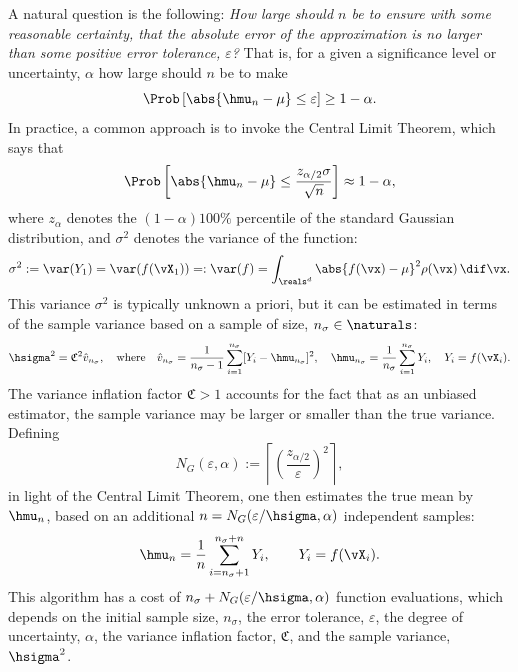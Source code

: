 \documentclass[graybox]{svmult}
\newcommand{\hv}{\hat{v}}
\newcommand{\fudge}{\mathfrak{C}}
\begin{document}
A natural question is the following: \emph{How large should $n$ be to ensure with some reasonable certainty, that the absolute error of the approximation is no larger than some positive error tolerance, $\varepsilon$?}  That is, for a given a significance level or uncertainty, $\alpha$ how large should $n$ be to make 
\begin{equation} \label{abserr}
\Prob\left[\abs{\hmu_n-\mu} \le \varepsilon \right] \geq 1-\alpha.
\end{equation}
In practice, a common approach is to invoke the Central Limit Theorem, which says that
\begin{equation} \label{CLT}
\Prob\left[\abs{\hmu_n-\mu} \le \frac{z_{\alpha/2} \sigma}{\sqrt{n}} \right] \approx 1-\alpha,
\end{equation}
where $z_\alpha$ denotes the $(1-\alpha)100\%$ percentile of the standard Gaussian distribution, and $\sigma^2$ denotes the variance of the function:
\begin{equation} \label{sigmadef}
\sigma^2 := \var(Y_1) = \var(f(\vX_1)) =: \var(f) = \int_{\reals^d} \abs{f(\vx)-\mu}^2 \rho(\vx) \, \dif \vx.
\end{equation}
This variance $\sigma^2$ is typically unknown a priori, but it can be estimated in terms of the sample variance based on a  sample of size, $n_{\sigma} \in \naturals$:
\begin{equation} \label{samplevar}
\hsigma^2 = \fudge^2 \hv_{n_{\sigma}}, \quad \text{where} \quad \hv_{n_{\sigma}} = \frac 1{n_{\sigma}-1} \sum_{i=1}^{n_{\sigma}} [Y_i- \hmu_{n_{\sigma}}]^2, \quad \hmu_{n_{\sigma}} = \frac 1{n_{\sigma}} \sum_{i=1}^{n_{\sigma}} Y_i, \quad Y_i=f(\vX_i).
\end{equation}
The variance inflation factor $\fudge>1$ accounts for the fact that as an unbiased estimator, the sample variance may be larger or smaller than the true variance.  Defining 
\begin{equation} \label{CLTsample}
N_{G}(\varepsilon,\alpha) :=\left \lceil \left(\frac{z_{\alpha/2}}{\varepsilon}\right)^2 \right \rceil, 
\end{equation}
in light of the Central Limit Theorem, one then estimates the true mean by $\hmu_{n}$, based on an additional $n=N_{G}(\varepsilon/\hsigma,\alpha)$ independent samples:
\begin{equation} \label{simpleMCest}
\hmu_n = \frac 1n \sum_{i=n_{\sigma}+1}^{n_{\sigma}+n} Y_i, \qquad Y_i = f(\vX_i).
\end{equation}
This algorithm has a cost of $n_{\sigma}+N_{G}(\varepsilon/\hsigma,\alpha)$ function evaluations, which depends on the initial sample size, $n_{\sigma}$, the error tolerance, $\varepsilon$, the degree of uncertainty, $\alpha$, the variance inflation factor, $\fudge$, and the sample variance, $\hsigma^2$.
\end{document}
